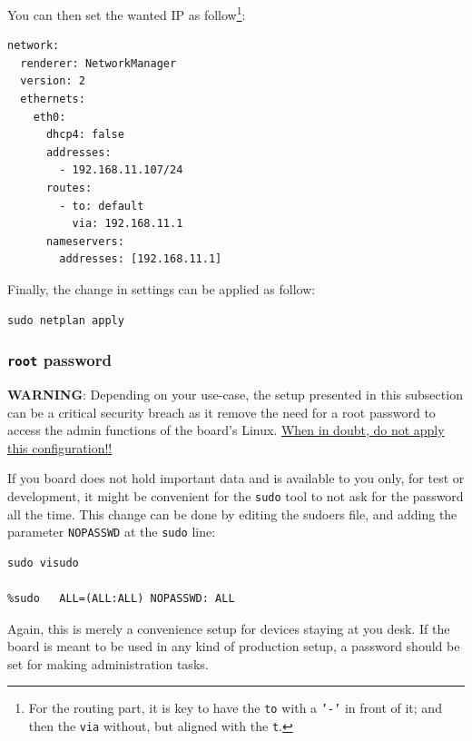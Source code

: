 \documentclass[10pt]{article}
\begin{document}
You can then set the wanted IP as follow\footnote{For the routing part, it is key to have the \texttt{to} with a \texttt{'-'} in front of
it; and then the \texttt{via} without, but aligned with the \texttt{t}.}:
\begin{verbatim}
network:
  renderer: NetworkManager
  version: 2
  ethernets:
    eth0:
      dhcp4: false
      addresses:
        - 192.168.11.107/24
      routes:
        - to: default
          via: 192.168.11.1
      nameservers:
        addresses: [192.168.11.1]
\end{verbatim}

Finally, the change in settings can be applied
as follow:

\begin{verbatim}
sudo netplan apply
\end{verbatim}

\subsubsection{\texttt{root} password}
\label{sec:orgb11f488}
\begin{tcolorbox}[colback=orange!5!white,colframe=orange!75!black]
\textbf{WARNING}: Depending on your use-case, the setup presented in this
subsection can be a critical security breach as it remove the need for a root
password to access the admin functions of the board's Linux.
\uline{When in doubt, do not apply this configuration!!}
\end{tcolorbox}

If you board does not hold important data
and is available to you only, for test or development,
it might be convenient for the \texttt{sudo} tool to not ask for the
password all the time.
This change can be done by editing the sudoers file, and
adding the parameter \texttt{NOPASSWD}
at the \texttt{sudo} line:

\begin{verbatim}
sudo visudo

%sudo   ALL=(ALL:ALL) NOPASSWD: ALL
\end{verbatim}

Again, this is merely a convenience setup for devices staying at you desk. If
the board is meant to be used in any kind of production setup, a password
should be set for making administration tasks.
\end{document}
